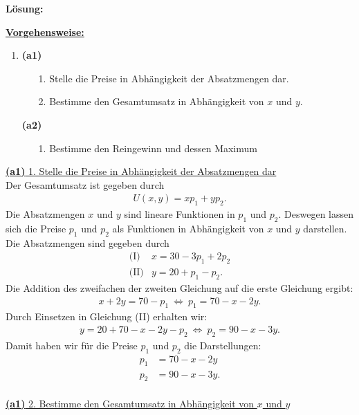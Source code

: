 \textbf{Lösung:}
\begin{mdframed}
\underline{\textbf{Vorgehensweise:}}
\renewcommand{\labelenumi}{\theenumi.}
\begin{enumerate}
\item{\textbf{(a1)}} 
\begin{enumerate}
	\item[1.] Stelle die Preise in Abhängigkeit der Absatzmengen dar.
	\item[2.] Bestimme den Gesamtumsatz in Abhängigkeit von $ x $ und $ y $.
\end{enumerate} 
\item[\textbf{(a2)}] 
\begin{enumerate}
	\item[1.] Bestimme den Reingewinn und dessen Maximum
\end{enumerate} 
\end{enumerate}
\end{mdframed}
\underline{\textbf{(a1)} 1. Stelle die Preise in Abhängigkeit der Absatzmengen dar}\\
Der Gesamtumsatz ist gegeben durch
\begin{align*}
	U(x,y) = x p_1 + y p_2.
\end{align*}
Die Absatzmengen $ x $ und $ y $ sind lineare Funktionen in $ p_1 $ und $ p_2 $. Deswegen lassen sich die Preise $ p_1 $ und $ p_2 $ als Funktionen in Abhängigkeit von $ x $ und $ y $ darstellen.
Die Absatzmengen sind gegeben durch
\begin{align*}
	\textrm{(I)}&	x = 30 - 3 p_1 + 2 p_2\\
	\textrm{(II)}&  y = 20 + p_1 - p_2 .
\end{align*}
Die Addition des zweifachen der zweiten Gleichung auf die erste Gleichung ergibt:
\begin{align*}
	x + 2y = 70 - p_1
	\ \Leftrightarrow \ 
	p_1 = 70 - x - 2y.
\end{align*}
Durch Einsetzen in Gleichung (II) erhalten wir:
\begin{align*}
	y = 20 + 70 - x - 2y - p_2 
	\ \Leftrightarrow \
	p_2 = 90 -x - 3y.
\end{align*}
Damit haben wir für die Preise $ p_1 $ und $ p_2 $ die Darstellungen:
\begin{align*}
	p_1 &= 70 - x - 2y\\
	p_2 &= 90 -x - 3y.
\end{align*}
\ \\
\underline{\textbf{(a1)} 2. Bestimme den Gesamtumsatz in Abhängigkeit von $ x $ und $ y $}\\
